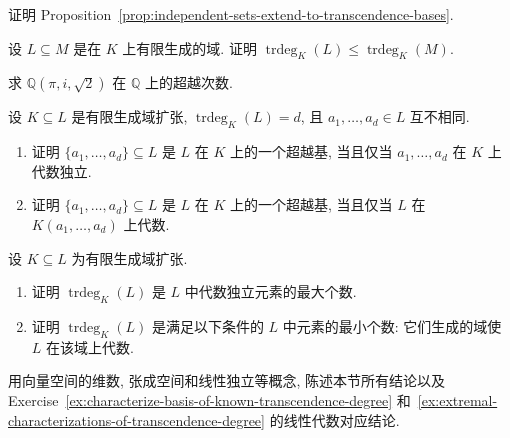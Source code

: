 \BookExerciseHeading
\begin{BookExercises}
  \item\label{ex:prove-independent-sets-extend-to-transcendence-bases} 证明 Proposition~\ref{prop:independent-sets-extend-to-transcendence-bases}.
  \item\label{ex:transcendence-degree-monotone-in-field} 设 $L\subseteq M$ 是在 $K$ 上有限生成的域. 证明 $\operatorname{trdeg}_{K}(L)\leq\operatorname{trdeg}_{K}(M)$.
  \item\label{ex:transcendence-degree-of-pi-i-square-root-two} 求 $\mathbb{Q}(\pi,i,\sqrt{2})$ 在 $\mathbb{Q}$ 上的超越次数.
  \item\label{ex:characterize-basis-of-known-transcendence-degree} 设 $K\subseteq L$ 是有限生成域扩张, $\operatorname{trdeg}_{K}(L)=d$, 且 $a_{1},\ldots,a_{d}\in L$ 互不相同.
  \begin{enumerate}
    \item 证明 $\{a_{1},\ldots,a_{d}\}\subseteq L$ 是 $L$ 在 $K$ 上的一个超越基, 当且仅当 $a_{1},\ldots,a_{d}$ 在 $K$ 上代数独立.
    \item 证明 $\{a_{1},\ldots,a_{d}\}\subseteq L$ 是 $L$ 在 $K$ 上的一个超越基, 当且仅当 $L$ 在 $K(a_{1},\ldots,a_{d})$ 上代数.
  \end{enumerate}
  \item\label{ex:extremal-characterizations-of-transcendence-degree} 设 $K\subseteq L$ 为有限生成域扩张.
  \begin{enumerate}
    \item 证明 $\operatorname{trdeg}_{K}(L)$ 是 $L$ 中代数独立元素的最大个数.
    \item 证明 $\operatorname{trdeg}_{K}(L)$ 是满足以下条件的 $L$ 中元素的最小个数: 它们生成的域使 $L$ 在该域上代数.
  \end{enumerate}
  \item\label{ex:linear-algebra-analogues-of-transcendence-degree} 用向量空间的维数, 张成空间和线性独立等概念, 陈述本节所有结论以及 Exercise~\ref{ex:characterize-basis-of-known-transcendence-degree} 和~\ref{ex:extremal-characterizations-of-transcendence-degree} 的线性代数对应结论.
\end{BookExercises}
